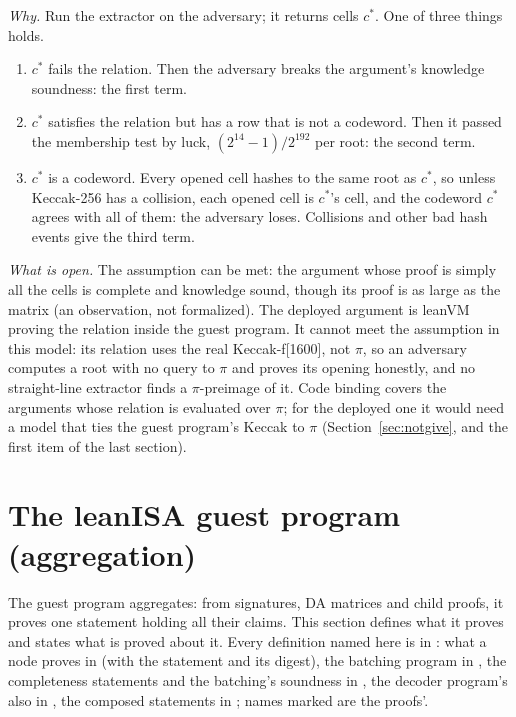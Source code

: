 \documentclass[11pt]{article}
\begin{document}
\emph{Why.} Run the extractor on the adversary; it returns cells $c^*$. One of three things holds.
\begin{enumerate}
\item $c^*$ fails the relation. Then the adversary breaks the argument's knowledge soundness:
the first term.
\item $c^*$ satisfies the relation but has a row that is not a codeword. Then it passed the
membership test by luck, $(2^{14}-1)/2^{192}$ per root: the second term.
\item $c^*$ is a codeword. Every opened cell hashes to the same root as $c^*$, so unless Keccak-256
has a collision, each opened cell is $c^*$'s cell, and the codeword $c^*$ agrees with all of them:
the adversary loses. Collisions and other bad hash events give the third term.
\end{enumerate}

\emph{What is open.} The assumption can be met: the argument whose proof is simply all the cells
is complete and knowledge sound, though its proof is as large as the matrix (an observation, not
formalized). The deployed argument is leanVM proving the relation inside the guest program. It cannot
meet the assumption in this model: its relation uses the real Keccak-f[1600], not $\pi$, so an
adversary computes a root with no query to $\pi$ and proves its opening honestly, and no
straight-line extractor finds a $\pi$-preimage of it. Code binding covers the arguments whose
relation is evaluated over $\pi$; for the deployed one it would need a model that ties the guest
program's Keccak to $\pi$ (Section~\ref{sec:notgive}, and the first item of the last section).

\section{The leanISA guest program (aggregation)}\label{sec:guest}

The guest program aggregates: from signatures, DA matrices and child proofs, it proves one statement
holding all their claims. This section defines what it proves and states what is proved about it.
Every definition named here is in : what a node proves in
 (with the statement and its digest), the batching program
in , the completeness statements and the batching's
soundness in , the decoder program's also in
, the composed statements in ; names
marked  are the proofs'.
\end{document}
